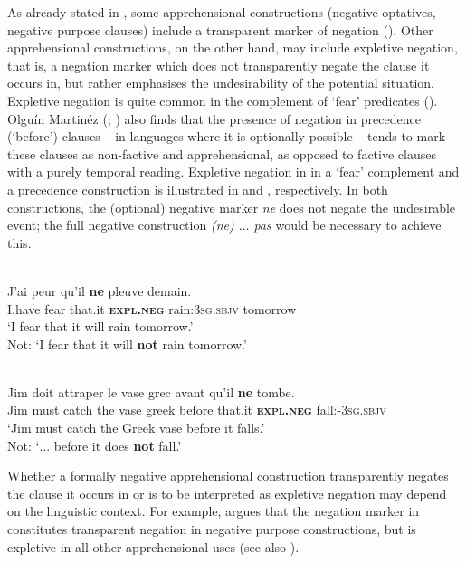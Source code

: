 \documentclass[output=paper,colorlinks,citecolor=brown]{langscibook}
\begin{document}
As already stated in , some apprehensional constructions (negative optatives, negative purpose clauses) include a transparent marker of negation (\citealt{chapters/wiemer}). Other apprehensional constructions, on the other hand, may include expletive negation, that is, a negation marker which does not transparently negate the clause it occurs in, but rather emphasises the undesirability of the potential situation. Expletive negation is quite common in the complement of `fear' predicates (\cite{jinkoenig2020, dobrushina2021}). Olguín Martinéz (\citeyear[601--602]{olguinmartinez2023a}; \citeyear[16]{olguinmartinez2023b}) also finds that the presence of negation in precedence (`before') clauses -- in languages where it is optionally possible -- tends to mark these clauses as non-factive and apprehensional, as opposed to factive clauses with a purely temporal reading. Expletive negation in  in a `fear' complement and a precedence construction is illustrated in  and , respectively. In both constructions, the (optional) negative marker \textit{ne} does not negate the undesirable event; the full  negative construction \textit{(ne) $\ldots$ pas} would be necessary to achieve this.

\ea 
\label{ex:intro13a}
 \\
\gll J'ai peur qu'il {\op}\textbf{ne}{\cp} pleuve demain. \\
I.have fear that.it \textsc{\textbf{expl.neg}} rain:\textsc{3sg.sbjv} tomorrow\\
\glt `I fear that it will rain tomorrow.'\\
Not: `I fear that it will \textbf{not} rain tomorrow.'\\
\z

\ea 
\label{ex:intro13b}
 \\
\gll Jim doit attraper le vase grec avant qu'il  {\op}\textbf{ne}{\cp} tombe.\\
Jim must catch the vase greek before that.it \textsc{\textbf{expl.neg}} fall:-\textsc{3sg.sbjv} \\
\glt `Jim must catch the Greek vase before it falls.'\\
Not: `$\ldots$ before it does \textbf{not} fall.'
\z


 Whether a formally negative apprehensional construction transparently negates the clause it occurs in or is to be interpreted as expletive negation may depend on the linguistic context. For example, \citet{chapters/fedotov} argues that the negation marker in  constitutes transparent negation in negative purpose constructions, but is expletive in all other apprehensional uses (see also ).
\end{document}
